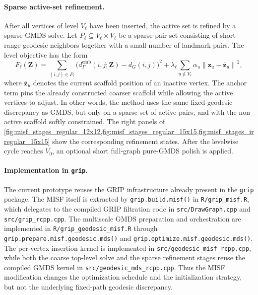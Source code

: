 \documentclass[twoside,11pt]{article}
\newcommand{\bz}{\mathbf{z}}
\newcommand{\bZ}{\mathbf{Z}}
\newcommand{\norm}[1]{\left\|#1\right\|}
\newcommand{\demb}{d^{\mathrm{emb}}}
\begin{document}
\paragraph{Sparse active-set refinement.}
After all vertices of level $V_\ell$ have been inserted, the active set is
refined by a sparse GMDS solve.  Let $P_\ell \subseteq V_\ell \times V_\ell$ be
a sparse pair set consisting of short-range geodesic neighbors together with a
small number of landmark pairs.  The level objective has the form
\[
  F_\ell(\bZ)
  =
  \sum_{(i,j)\in P_\ell}
  \bigl(
    \demb_{\Gamma}(i,j;\bZ) - d_G(i,j)
  \bigr)^2
  +
  \lambda_\ell
  \sum_{u \notin V_\ell}
  \alpha_u \norm{\bz_u - \bar{\bz}_u}^2,
\]
where $\bar{\bz}_u$ denotes the current scaffold position of an inactive
vertex.  The anchor term pins the already constructed coarser scaffold while
allowing the active vertices to adjust.  In other words, the method uses the
same fixed-geodesic discrepancy as GMDS, but only on a sparse set of active
pairs, and with the non-active scaffold softly constrained.  The right panels
of \cref{fig:misf_stages_regular_12x12,fig:misf_stages_regular_15x15,fig:misf_stages_irregular_15x15}
show the corresponding refinement states.  After the levelwise cycle reaches
$V_0$, an optional short full-graph pure-GMDS polish is applied.

\paragraph{Implementation in \texttt{grip}.}
The current prototype reuses the GRIP infrastructure already present in the
\texttt{grip} package.  The MISF itself is extracted by
\texttt{grip.build.misf()} in \texttt{R/grip\_misf.R}, which delegates to the
compiled GRIP filtration code in \texttt{src/DrawGraph.cpp} and
\texttt{src/grip\_rcpp.cpp}.  The multiscale GMDS preparation and orchestration
are implemented in \texttt{R/grip\_geodesic\_misf.R} through
\texttt{grip.prepare.misf.geodesic.mds()} and
\texttt{grip.optimize.misf.geodesic.mds()}.  The per-vertex insertion kernel is
implemented in \texttt{src/geodesic\_misf\_rcpp.cpp}, while both the coarse
top-level solve and the sparse refinement stages reuse the compiled GMDS kernel
in \texttt{src/geodesic\_mds\_rcpp.cpp}.  Thus the MISF modification changes the
optimization schedule and the initialization strategy, but not the underlying
fixed-path geodesic discrepancy.
\end{document}
